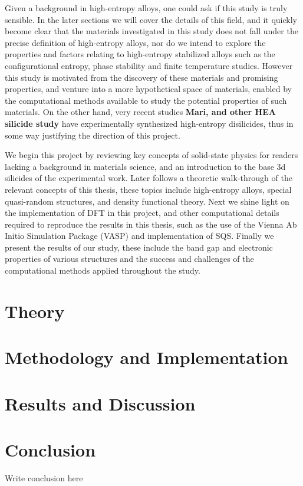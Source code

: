 \documentclass[UKenglish]{ifimaster}  %
\begin{document}
Given a background in high-entropy alloys, one could ask if this study is truly sensible. In the later sections we will cover the details of this field, and it quickly become clear that the materials investigated in this study does not fall under the precise definition of high-entropy alloys, nor do we intend to explore the properties and factors relating to high-entropy stabilized alloys such as the configurational entropy, phase stability and finite temperature studies. However this study is motivated from the discovery of these materials and promising properties, and venture into a more hypothetical space of materials, enabled by the computational methods available to study the potential properties of such materials. On the other hand, very recent studies \textbf{Mari, and other HEA silicide study} have experimentally synthesized high-entropy disilicides, thus in some way justifying the direction of this project. 

We begin this project by reviewing key concepts of solid-state physics for readers lacking a background in materials science, and an introduction to the base 3d silicides of the experimental work. Later follows a theoretic walk-through of the relevant concepts of this thesis, these topics include high-entropy alloys, special quasi-random structures, and density functional theory. Next we shine light on the implementation of DFT in this project, and other computational details required to reproduce the results in this thesis, such as the use of the Vienna Ab Initio Simulation Package (VASP) and implementation of SQS. Finally we present the results of our study, these include the band gap and electronic properties of various structures and the success and challenges of the computational methods applied throughout the study. 

\part{Theory}                    %




\part{Methodology and Implementation}


 
\part{Results and Discussion}





\part{Conclusion}
Write conclusion here

\appendix





\backmatter{}
\printbibliography
\end{document}
